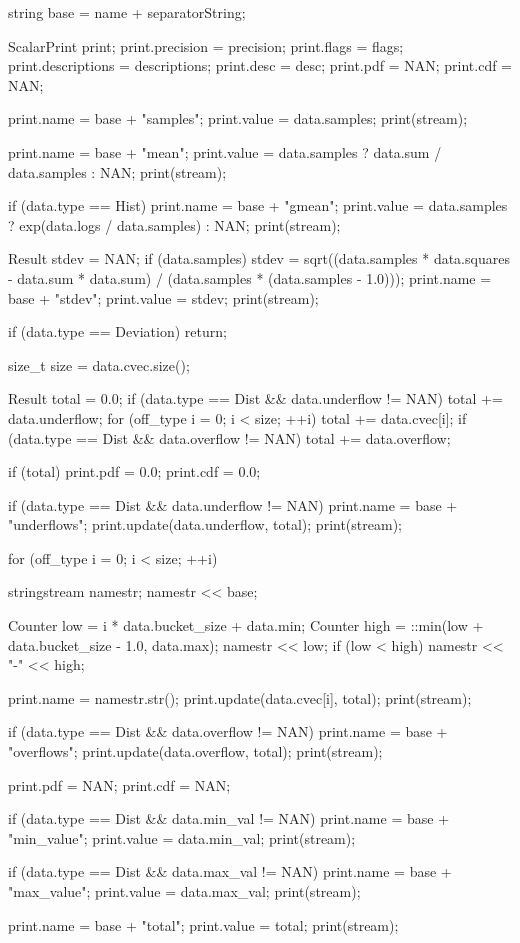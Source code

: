\begin{DoxyCode}
{
    string base = name + separatorString;

    ScalarPrint print;
    print.precision = precision;
    print.flags = flags;
    print.descriptions = descriptions;
    print.desc = desc;
    print.pdf = NAN;
    print.cdf = NAN;

    print.name = base + "samples";
    print.value = data.samples;
    print(stream);

    print.name = base + "mean";
    print.value = data.samples ? data.sum / data.samples : NAN;
    print(stream);

    if (data.type == Hist) {
        print.name = base + "gmean";
        print.value = data.samples ? exp(data.logs / data.samples) : NAN;
        print(stream);
    }

    Result stdev = NAN;
    if (data.samples)
        stdev = sqrt((data.samples * data.squares - data.sum * data.sum) /
                     (data.samples * (data.samples - 1.0)));
    print.name = base + "stdev";
    print.value = stdev;
    print(stream);

    if (data.type == Deviation)
        return;

    size_t size = data.cvec.size();

    Result total = 0.0;
    if (data.type == Dist && data.underflow != NAN)
        total += data.underflow;
    for (off_type i = 0; i < size; ++i)
        total += data.cvec[i];
    if (data.type == Dist && data.overflow != NAN)
        total += data.overflow;

    if (total) {
        print.pdf = 0.0;
        print.cdf = 0.0;
    }

    if (data.type == Dist && data.underflow != NAN) {
        print.name = base + "underflows";
        print.update(data.underflow, total);
        print(stream);
    }

    for (off_type i = 0; i < size; ++i) {
        stringstream namestr;
        namestr << base;

        Counter low = i * data.bucket_size + data.min;
        Counter high = ::min(low + data.bucket_size - 1.0, data.max);
        namestr << low;
        if (low < high)
            namestr << "-" << high;

        print.name = namestr.str();
        print.update(data.cvec[i], total);
        print(stream);
    }

    if (data.type == Dist && data.overflow != NAN) {
        print.name = base + "overflows";
        print.update(data.overflow, total);
        print(stream);
    }

    print.pdf = NAN;
    print.cdf = NAN;

    if (data.type == Dist && data.min_val != NAN) {
        print.name = base + "min_value";
        print.value = data.min_val;
        print(stream);
    }

    if (data.type == Dist && data.max_val != NAN) {
        print.name = base + "max_value";
        print.value = data.max_val;
        print(stream);
    }

    print.name = base + "total";
    print.value = total;
    print(stream);
}
\end{DoxyCode}


